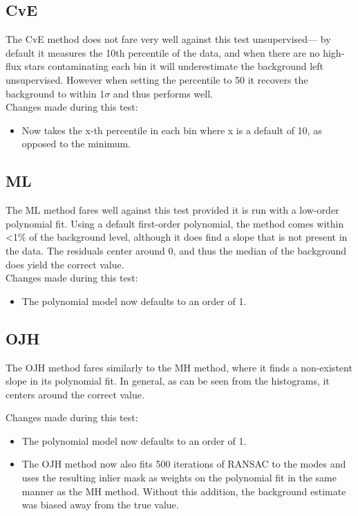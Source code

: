 \documentclass[10pt, a4paper]{article}
\begin{document}
\subsection{CvE}
The CvE method does not fare very well against this test unsupervised--- by default it measures the 10th percentile of the data, and when there are no high-flux stars contaminating each bin it will underestimate the background left unsupervised. However when setting the percentile to 50 it recovers the background to within 1$\sigma$ and thus performs well.\\

Changes made during this test:
\begin{itemize}
\item Now takes the x-th percentile in each bin where x is a default of 10, as opposed to the minimum.
\end{itemize}

\subsection{ML}
The ML method fares well against this test provided it is run with a low-order polynomial fit. Using a default first-order polynomial, the method comes within <1$\%$ of the background level, although it does find a slope that is not present in the data. The residuals center around 0, and thus the median of the background does yield the correct value.\\

Changes made during this test:
\begin{itemize}
\item The polynomial model now defaults to an order of 1.
\end{itemize}

\subsection{OJH}
The OJH method fares similarly to the MH method, where it finds a non-existent slope in its polynomial fit. In general, as can be seen from the histograms, it centers around the correct value.

Changes made during this test:
\begin{itemize}
\item The polynomial model now defaults to an order of 1.
\item The OJH method now also fits 500 iterations of RANSAC to the modes and uses the resulting inlier mask as weights on the polynomial fit in the same manner as the MH method. Without this addition, the background estimate was biased away from the true value.
\end{itemize}
\end{document}
